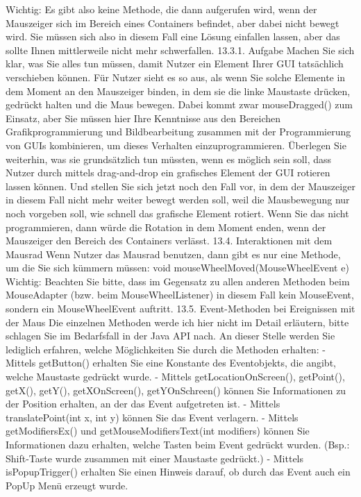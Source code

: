 Wichtig: Es gibt also keine Methode, die dann aufgerufen wird, wenn der Mauszeiger sich im Bereich eines Containers befindet, aber dabei nicht bewegt wird. Sie müssen sich also in diesem Fall eine Lösung einfallen lassen, aber das sollte Ihnen mittlerweile nicht mehr schwerfallen.
13.3.1.	Aufgabe
Machen Sie sich klar, was Sie alles tun müssen, damit Nutzer ein Element Ihrer GUI tatsächlich verschieben können. Für Nutzer sieht es so aus, als wenn Sie solche Elemente in dem Moment an den Mauszeiger binden, in dem sie die linke Maustaste drücken, gedrückt halten und die Maus bewegen. Dabei kommt zwar mouseDragged() zum Einsatz, aber Sie müssen hier Ihre Kenntnisse aus den Bereichen Grafikprogrammierung und Bildbearbeitung zusammen mit der Programmierung von GUIs kombinieren, um dieses Verhalten einzuprogrammieren.
Überlegen Sie weiterhin, was sie grundsätzlich tun müssten, wenn es möglich sein soll, dass Nutzer durch mittels drag-and-drop ein grafisches Element der GUI rotieren lassen können.
Und stellen Sie sich jetzt noch den Fall vor, in dem der Mauszeiger in diesem Fall nicht mehr weiter bewegt werden soll, weil die Mausbewegung nur noch vorgeben soll, wie schnell das grafische Element rotiert. Wenn Sie das nicht programmieren, dann würde die Rotation in dem Moment enden, wenn der Mauszeiger den Bereich des Containers verlässt.
13.4.	Interaktionen mit dem Mausrad
Wenn Nutzer das Mausrad benutzen, dann gibt es nur eine Methode, um die Sie sich kümmern müssen: void mouseWheelMoved(MouseWheelEvent e)
Wichtig: Beachten Sie bitte, dass im Gegensatz zu allen anderen Methoden beim MouseAdapter (bzw. beim MouseWheelListener) in diesem Fall kein MouseEvent, sondern ein MouseWheelEvent auftritt.
13.5.	Event-Methoden bei Ereignissen mit der Maus
Die einzelnen Methoden werde ich hier nicht im Detail erläutern, bitte schlagen Sie im Bedarfsfall in der Java API nach. An dieser Stelle werden Sie lediglich erfahren, welche Möglichkeiten Sie durch die Methoden erhalten:
-	Mittels getButton() erhalten Sie eine Konstante des Eventobjekts, die angibt, welche Maustaste gedrückt wurde.
-	Mittels getLocationOnScreen(), getPoint(), getX(), getY(), getXOnScreen(), getYOnSchreen() können Sie Informationen zu der Position erhalten, an der das Event aufgetreten ist.
-	Mittels translatePoint(int x, int y) können Sie das Event verlagern.
-	Mittels getModifiersEx() und getMouseModifiersText(int modifiers) können Sie Informationen dazu erhalten, welche Tasten beim Event gedrückt wurden. (Bsp.: Shift-Taste wurde zusammen mit einer Maustaste gedrückt.)
-	Mittels isPopupTrigger() erhalten Sie einen Hinweis darauf, ob durch das Event auch ein PopUp Menü erzeugt wurde.
